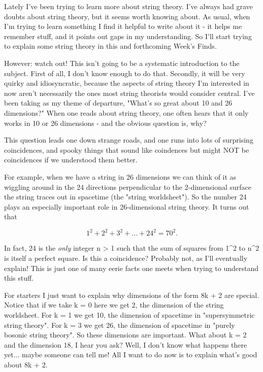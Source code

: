 




Lately I've been trying to learn more about string theory.  I've always
had grave doubts about string theory, but it seems worth knowing about.
As usual, when I'm trying to learn something I find it helpful to write
about it - it helps me remember stuff, and it points out gaps in my
understanding.  So I'll start trying to explain some string theory in
this and forthcoming Week's Finds.

However: watch out!  This isn't going to be a systematic introduction to
the subject.  First of all, I don't know enough to do that.  Secondly,
it will be very quirky and idiosyncratic, because the aspects of string
theory I'm interested in now aren't necessarily the ones most string
theorists would consider central.  I've been taking as my theme of
departure, "What's so great about 10 and 26 dimensions?"  When one
reads about string theory, one often hears that it only works in 10
or 26 dimensions - and the obvious question is, why?

This question leads one down strange roads, and one runs into lots of
surprising coincidences, and spooky things that sound like coindences
but might NOT be coincidences if we understood them better.   

For example, when we have a string in 26 dimensions we can think of it
as wiggling around in the 24 directions perpendicular to the
2-dimensional surface the string traces out in spacetime (the "string
worldsheet").  So the number 24 plays an especially important role in
26-dimensional string theory.  It turns out that

$$
  1^{2} + 2^{2} + 3^{2} + ... + 24^{2} = 70^{2}.  
$$
    
In fact, 24 is the \emph{only} integer n > 1 such that the sum of squares 
from 1^{2} to n^{2} is itself a perfect square.  Is this a 
coincidence?
Probably not, as I'll eventually explain!  This is just one of
many eerie facts one meets when trying to understand this stuff.


For starters I just want to explain why dimensions of the form 8k + 2
are special.  Notice that if we take k = 0 here we get 2, the dimension
of the string worldsheet.  For k = 1 we get 10, the dimension of
spacetime in "supersymmetric string theory".  For k = 3 we get
26, the dimension of spacetime in "purely bosonic string
theory".  So these dimensions are important.  What about k = 2 and
the dimension 18, I hear you ask?  Well, I don't know what happens there
yet... maybe someone can tell me!  All I want to do now is to explain
what's good about 8k + 2.

